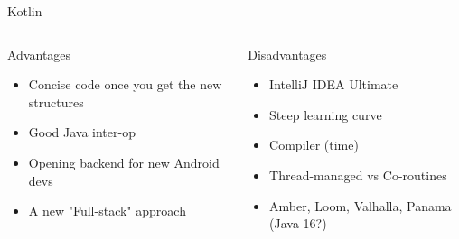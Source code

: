 \documentclass[aspectratio=169]{beamer}
\begin{document}
\begin{frame}{Kotlin}
\begin{columns}
	
	\begin{column}{0.5\textwidth}
		Advantages
		\begin{itemize}
			\item Concise code once you get the new structures
			\item Good Java inter-op
			\item Opening backend for new Android devs
			\item A new "Full-stack" approach
		\end{itemize}
	\end{column}
	\begin{column}{0.5\textwidth}
		Disadvantages 
		\begin{itemize}
			\item IntelliJ IDEA Ultimate
			\item Steep learning curve
			\item Compiler (time)
			\item Thread-managed vs Co-routines
			\item Amber, Loom, Valhalla, Panama (Java 16?)
		\end{itemize}
	\end{column}
\end{columns}
\end{frame}
\end{document}

